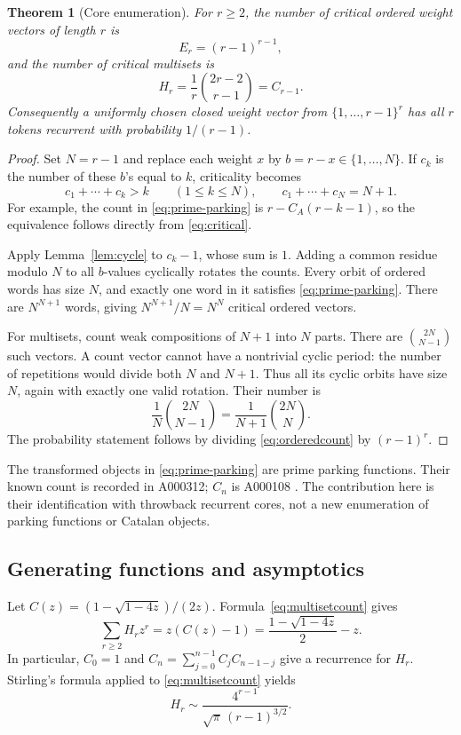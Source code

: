 \documentclass[11pt,letterpaper]{article}
\newtheorem{theorem}{Theorem}[section]
\theoremstyle{definition}
\begin{document}
\begin{theorem}[Core enumeration]\label{thm:counts}
For $r\ge2$, the number of critical ordered weight vectors of length $r$ is
\begin{equation}\label{eq:orderedcount}
 E_r=(r-1)^{r-1},
\end{equation}
and the number of critical multisets is
\begin{equation}\label{eq:multisetcount}
 H_r=\frac1r\binom{2r-2}{r-1}=C_{r-1}.
\end{equation}
Consequently a uniformly chosen closed weight vector from
$\{1,\ldots,r-1\}^r$ has all $r$ tokens recurrent with probability
$1/(r-1)$.
\end{theorem}
\begin{proof}
Set $N=r-1$ and replace each weight $x$ by $b=r-x\in\{1,\ldots,N\}$.
If $c_k$ is the number of these $b$'s equal to $k$, criticality becomes
\begin{equation}\label{eq:prime-parking}
 c_1+\cdots+c_k>k\qquad(1\le k\le N),
 \qquad c_1+\cdots+c_N=N+1.
\end{equation}
For example, the count in \eqref{eq:prime-parking} is
$r-C_A(r-k-1)$, so the equivalence follows directly from
\eqref{eq:critical}.

Apply Lemma~\ref{lem:cycle} to $c_k-1$, whose sum is $1$. Adding a common
residue modulo $N$ to all $b$-values cyclically rotates the counts. Every
orbit of ordered words has size $N$, and exactly one word in it satisfies
\eqref{eq:prime-parking}. There are $N^{N+1}$ words, giving
$N^{N+1}/N=N^N$ critical ordered vectors.

For multisets, count weak compositions of $N+1$ into $N$ parts. There are
$\binom{2N}{N-1}$ such vectors. A count vector cannot have a nontrivial
cyclic period: the number of repetitions would divide both $N$ and $N+1$.
Thus all its cyclic orbits have size $N$, again with exactly one valid
rotation. Their number is
\[
 \frac1N\binom{2N}{N-1}
   =\frac1{N+1}\binom{2N}{N}.
\]
The probability statement follows by dividing \eqref{eq:orderedcount} by
$(r-1)^r$.
\end{proof}
The transformed objects in \eqref{eq:prime-parking} are prime parking
functions. Their known count is recorded in A000312; $C_n$ is A000108
\cite{A000312,A000108}. The contribution here is their identification with
throwback recurrent cores, not a new enumeration of parking functions or
Catalan objects.

\subsection{Generating functions and asymptotics}
Let $C(z)=(1-\sqrt{1-4z})/(2z)$. Formula~\eqref{eq:multisetcount} gives
\begin{equation}\label{eq:core-ogf}
 \sum_{r\ge2}H_rz^r=z(C(z)-1)
  =\frac{1-\sqrt{1-4z}}2-z.
\end{equation}
In particular, $C_0=1$ and
$C_n=\sum_{j=0}^{n-1}C_jC_{n-1-j}$ give a recurrence for $H_r$.
Stirling's formula applied to \eqref{eq:multisetcount} yields
\[
 H_r\sim\frac{4^{r-1}}{\sqrt\pi\,(r-1)^{3/2}}.
\]
\end{document}
